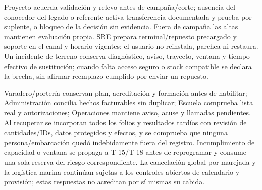 Proyecto acuerda validación y relevo antes de campaña/corte; ausencia del conocedor del legado o referente activa transferencia documentada y prueba por suplente, o bloqueo de la decisión sin evidencia. Fuera de campaña las altas mantienen evaluación propia. SRE prepara terminal/repuesto precargado y soporte en el canal y horario vigentes; el usuario no reinstala, parchea ni restaura. Un incidente de terreno conserva diagnóstico, aviso, trayecto, ventana y tiempo efectivo de sustitución; cuando falta acceso seguro o stock compatible se declara la brecha, sin afirmar reemplazo cumplido por enviar un repuesto.

Varadero/portería conservan plan, acreditación y formación antes de habilitar; Administración concilia hechos facturables sin duplicar; Escuela comprueba lista real y autorizaciones; Operaciones mantiene aviso, acuse y llamadas pendientes. Al recuperar se incorporan todos los folios y resultados tardíos con revisión de cantidades/IDs, datos protegidos y efectos, y se comprueba que ninguna persona/embarcación quedó indebidamente fuera del registro. Incumplimiento de capacidad o ventana se propaga a T-15/T-18 antes de reprogramar y consume una sola reserva del riesgo correspondiente. La cancelación global por marejada y la logística marina continúan sujetas a los controles abiertos de calendario y provisión; estas respuestas no acreditan por sí mismas su cabida.

